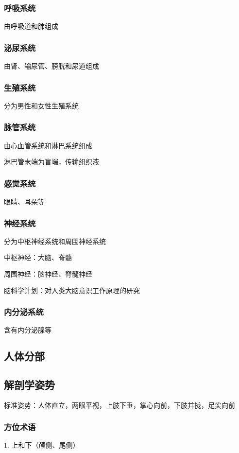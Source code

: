 \subsubsection{呼吸系统}%
\label{subsub:呼吸系统}
由呼吸道和肺组成
\subsubsection{泌尿系统}%
\label{subsub:泌尿系统}
由肾、输尿管、膀胱和尿道组成
\subsubsection{生殖系统}%
\label{subsub:生殖系统}
分为男性和女性生殖系统
\subsubsection{脉管系统}%
\label{subsub:脉管系统}
由心血管系统和淋巴系统组成
\begin{notation}
    淋巴管末端为盲端，传输组织液
\end{notation}
\subsubsection{感觉系统}%
\label{subsub:感觉系统}
眼睛、耳朵等
\subsubsection{神经系统}%
\label{subsub:神经系统}
分为中枢神经系统和周围神经系统

中枢神经：大脑、脊髓

周围神经：脑神经、脊髓神经
\begin{notation}
    脑科学计划：对人类大脑意识工作原理的研究
\end{notation}
\subsubsection{内分泌系统}%
\label{subsub:内分泌系统}
含有内分泌腺等
\subsection{人体分部}%
\label{sub:人体分部}
\subsection{解剖学姿势}%
\label{sub:解剖学姿势}
标准姿势：人体直立，两眼平视，上肢下垂，掌心向前，下肢并拢，足尖向前
\subsubsection{方位术语}%
\label{subsub:方位术语}
1. 上和下（颅侧、尾侧）

